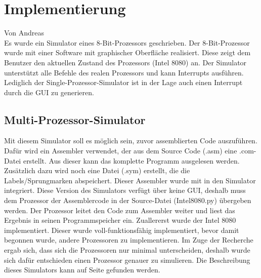 \documentclass[12pt]{article}
\begin{document}
\newpage

\section{Implementierung}
Von Andreas\\

\noindent
Es wurde ein Simulator eines 8-Bit-Prozessors geschrieben.
Der 8-Bit-Prozessor wurde mit einer Software mit graphischer Oberfläche realisiert. Diese zeigt dem Benutzer den aktuellen Zustand des Prozessors (Intel 8080) an. Der Simulator unterstützt alle Befehle des realen Prozessors und kann Interrupts ausführen. Lediglich der Single-Prozessor-Simulator ist in der Lage auch einen Interrupt durch die GUI zu generieren.


\subsection{Multi-Prozessor-Simulator}
Mit diesem Simulator soll es möglich sein, zuvor assemblierten Code auszuführen. Dafür wird ein Assembler \cite{Assembler} verwendet, der aus dem Source Code (.asm) eine .com-Datei erstellt. Aus dieser kann das komplette Programm ausgelesen werden. Zusätzlich dazu wird noch eine Datei (.sym) erstellt, die die Labels/Sprungmarken abspeichert. Dieser Assembler wurde mit in den Simulator integriert. Diese Version des Simulators verfügt über keine GUI, deshalb muss dem Prozessor der Assemblercode in der Source-Datei (Intel8080.py) übergeben werden. Der Prozessor leitet den Code zum Assembler weiter und liest das Ergebnis in seinen Programmspeicher ein. 
Zuallererst wurde der Intel 8080 implementiert. Dieser wurde voll-funktionsfähig implementiert, bevor damit begonnen wurde, andere Prozessoren zu implementieren. Im Zuge der Recherche ergab sich, dass sich die Prozessoren nur minimal unterscheiden, deshalb wurde sich dafür entschieden einen Prozessor genauer zu simulieren. Die Beschreibung dieses Simulators kann auf Seite \pageref{SPS_impl} gefunden werden.
\end{document}
